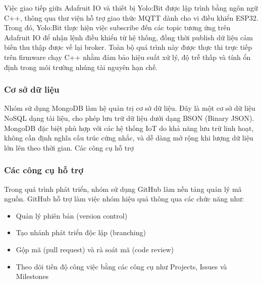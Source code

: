 Việc giao tiếp giữa Adafruit IO và thiết bị Yolo:Bit được lập trình bằng ngôn ngữ C++, thông qua thư viện hỗ trợ giao thức MQTT dành cho vi điều khiển ESP32. Trong đó, Yolo:Bit thực hiện việc subscribe đến các topic tương ứng trên Adafruit IO để nhận lệnh điều khiển từ hệ thống, đồng thời publish dữ liệu cảm biến thu thập được về lại broker. Toàn bộ quá trình này được thực thi trực tiếp trên firmware chạy C++ nhằm đảm bảo hiệu suất xử lý, độ trễ thấp và tính ổn định trong môi trường nhúng tài nguyên hạn chế.

\subsubsection{Cơ sở dữ liệu}

Nhóm sử dụng MongoDB làm hệ quản trị cơ sở dữ liệu. Đây là một cơ sở dữ liệu NoSQL dạng tài liệu, cho phép lưu trữ dữ liệu dưới dạng BSON (Binary JSON). MongoDB đặc biệt phù hợp với các hệ thống IoT do khả năng lưu trữ linh hoạt, không cần định nghĩa cấu trúc cứng nhắc, và dễ dàng mở rộng khi lượng dữ liệu lớn lên theo thời gian.
Các công cụ hỗ trợ

\subsubsection{Các công cụ hỗ trợ}

Trong quá trình phát triển, nhóm sử dụng GitHub làm nền tảng quản lý mã nguồn. GitHub hỗ trợ làm việc nhóm hiệu quả thông qua các chức năng như:
\begin{itemize}
    \item Quản lý phiên bản (version control)
    \item Tạo nhánh phát triển độc lập (branching)
    \item Gộp mã (pull request) và rà soát mã (code review)
    \item Theo dõi tiến độ công việc bằng các công cụ như Projects, Issues và Milestones
\end{itemize}

\newpage
